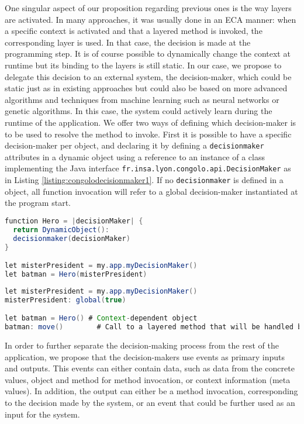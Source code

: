 \documentclass{sig-alternate}
\begin{document}
One singular aspect of our proposition regarding previous ones is the way layers are activated. In many approaches, it was usually done in an ECA manner: when a specific context is activated and that a layered method is invoked, the corresponding layer is used. In that case, the decision is made at the programming step. It is of course possible to dynamically change the context at runtime but its binding to the layers is still static. In our case, we propose to delegate this decision to an external system, the decision-maker, which could be static just as in existing approaches but could also be based on more advanced algorithms and techniques from machine learning such as neural networks or genetic algorithms.  In this case, the system could actively learn during the runtime of the application. We offer two ways of defining which decision-maker is to be used to resolve the method to invoke. First it is possible to have a specific decision-maker per object, and declaring it by defining a \lstinline|decisionmaker| attributes in a dynamic object using a reference to an instance of a class implementing the Java interface \lstinline|fr.insa.lyon.congolo.api.DecisionMaker| as in Listing \ref{listing:congolodecisionmaker1}. If no \lstinline|decisionmaker| is defined in a object, all function invocation will refer to a global decision-maker instantiated at the program start.

\begin{lstlisting}[float, language=Java, caption=Congolo decision maker definition, label={listing:congolodecisionmaker1}]
function Hero = |decisionMaker| {
  return DynamicObject():
  decisionmaker(decisionMaker)
}

let misterPresident = my.app.myDecisionMaker()
let batman = Hero(misterPresident)
\end{lstlisting}

\begin{lstlisting}[float, language=Java, caption=Congolo example, label={listing:congolohero}]
let misterPresident = my.app.myDecisionMaker()
misterPresident: global(true)

let batman = Hero() # Context-dependent object
batman: move()        # Call to a layered method that will be handled by the local or global decision-maker

\end{lstlisting}

In order to further separate the decision-making process from the rest of the application, we propose that the decision-makers use events as primary inputs and outputs. This events can either contain data, such as data from the concrete values, object and method for method invocation, or context information (meta values). In addition, the output can either be a method invocation, corresponding to the decision made by the system, or an event that could be further used as an input for the system.
 
\end{document}
